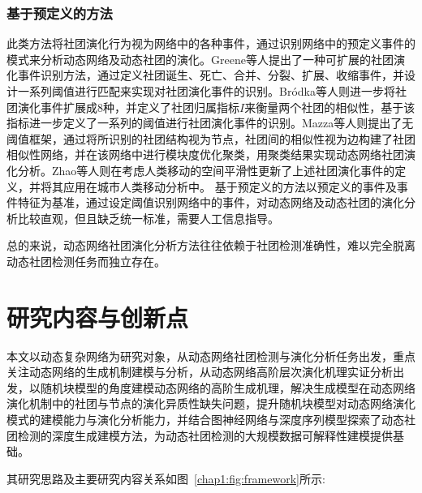 \subsubsection{基于预定义的方法}
此类方法将社团演化行为视为网络中的各种事件，通过识别网络中的预定义事件的模式来分析动态网络及动态社团的演化。Greene等人\cite{greene2010tracking}提出了一种可扩展的社团演化事件识别方法，通过定义社团诞生、死亡、合并、分裂、扩展、收缩事件，并设计一系列阈值进行匹配来实现对社团演化事件的识别。Br{\'o}dka等人\cite{brodka2013ged}则进一步将社团演化事件扩展成$8$种，并定义了社团归属指标$I$来衡量两个社团的相似性，基于该指标进一步定义了一系列的阈值进行社团演化事件的识别。Mazza等人\cite{mazza2023modularity}则提出了无阈值框架，通过将所识别的社团结构视为节点，社团间的相似性视为边构建了社团相似性网络，并在该网络中进行模块度优化聚类，用聚类结果实现动态网络社团演化分析。Zhao等人\cite{zhao2023dynamic}则在考虑人类移动的空间平滑性更新了上述社团演化事件的定义，并将其应用在城市人类移动分析中。
基于预定义的方法以预定义的事件及事件特征为基准，通过设定阈值识别网络中的事件，对动态网络及动态社团的演化分析比较直观，但且缺乏统一标准，需要人工信息指导。

总的来说，动态网络社团演化分析方法往往依赖于社团检测准确性，难以完全脱离动态社团检测任务而独立存在。

\section{研究内容与创新点}

本文以动态复杂网络为研究对象，从动态网络社团检测与演化分析任务出发，重点关注动态网络的生成机制建模与分析，从动态网络高阶层次演化机理实证分析出发，以随机块模型的角度建模动态网络的高阶生成机理，解决生成模型在动态网络演化机制中的社团与节点的演化异质性缺失问题，提升随机块模型对动态网络演化模式的建模能力与演化分析能力，并结合图神经网络与深度序列模型探索了动态社团检测的深度生成建模方法，为动态社团检测的大规模数据可解释性建模提供基础。


其研究思路及主要研究内容关系如图~\ref{chap1:fig:framework}所示:


